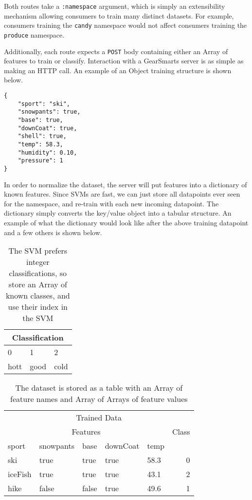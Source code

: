 Both routes take a \texttt{:namespace} argument, which is simply an extensibility mechanism allowing consumers to train
many distinct datasets. For example, consumers training the \texttt{candy} namespace would not affect consumers training
the \texttt{produce} namespace.

Additionally, each route expects a \texttt{POST} body containing either an Array of features to
train or classify. Interaction with a GearSmarts server is as simple as making an HTTP call. An example of an Object
training structure is shown below.

\begin{lstlisting}
{
    "sport": "ski",
    "snowpants": true,
    "base": true,
    "downCoat": true,
    "shell": true,
    "temp": 58.3,
    "humidity": 0.10,
    "pressure": 1
}
\end{lstlisting}

In order to normalize the dataset, the server will put features into a dictionary of known features. Since SVMs are
fast, we can just store all datapoints ever seen for the namespace, and re-train with each new incoming datapoint.
The dictionary simply converts the key/value object into a tabular structure. An example of what the dictionary would
look like after the above training datapoint and a few others is shown below.

\begin{table}
\label{table:classifications}
    \begin{tabular}{lll}
        \hline
        \multicolumn{3}{c}{Classification} \\
        \hline
        0 & 1 & 2 \\
        hott & good & cold \\
        \hline
    \end{tabular}
    \caption{The SVM prefers integer classifications, so store an Array of known classes, and use their index in the SVM}
\end{table}

\begin{table}
\label{table:dictionary}
    \begin{tabular}{lllllr}
        \hline
        \multicolumn{6}{c}{Trained Data} \\
        \multicolumn{5}{c}{Features} & Class \\
        \hline
        sport   & snowpants & base  & downCoat & temp   \\
        \hline
        \hline
        ski     & true      & true  & true      & 58.3  & 0 \\
        iceFish & true      & true  & true      & 43.1  & 2 \\
        hike    & false     & false & true      & 49.6  & 1 \\
        \hline
    \end{tabular}
    \caption{The dataset is stored as a table with an Array of feature names and Array of Arrays of feature values}
\end{table}


